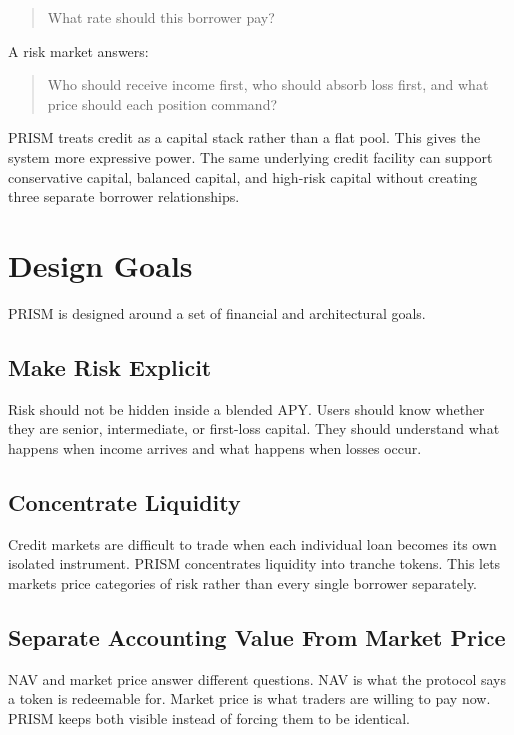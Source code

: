 \documentclass[11pt]{article}
\begin{document}
\begin{quote}
What rate should this borrower pay?
\end{quote}

A risk market answers:

\begin{quote}
Who should receive income first, who should absorb loss first, and what price
should each position command?
\end{quote}

PRISM treats credit as a capital stack rather than a flat pool. This gives the
system more expressive power. The same underlying credit facility can support
conservative capital, balanced capital, and high-risk capital without creating
three separate borrower relationships.

\section{Design Goals}

PRISM is designed around a set of financial and architectural goals.

\subsection{Make Risk Explicit}

Risk should not be hidden inside a blended APY. Users should know whether they
are senior, intermediate, or first-loss capital. They should understand what
happens when income arrives and what happens when losses occur.

\subsection{Concentrate Liquidity}

Credit markets are difficult to trade when each individual loan becomes its own
isolated instrument. PRISM concentrates liquidity into tranche tokens. This lets
markets price categories of risk rather than every single borrower separately.

\subsection{Separate Accounting Value From Market Price}

NAV and market price answer different questions. NAV is what the protocol says a
token is redeemable for. Market price is what traders are willing to pay now.
PRISM keeps both visible instead of forcing them to be identical.
\end{document}

